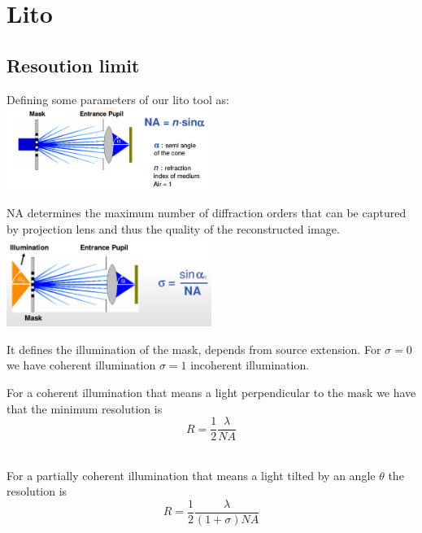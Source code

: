 
\section{Lito}

\subsection{Resoution limit}
Defining some parameters of our lito tool as:\\

\centering
\includegraphics[width=0.5\textwidth]{NA.png}\\
\raggedright

NA determines the maximum number of diffraction orders that can be captured by projection lens and thus the quality of the reconstructed image.\\

\centering
\includegraphics[width=0.5\textwidth]{sigma.png}\\
\raggedright

It defines the illumination of the mask, depends from source extension. For $\sigma=0$ we have coherent illumination $\sigma=1$ incoherent illumination.\\

\vspace{3mm}

For a coherent illumination that means a light perpendicular to the mask we have that the minimum resolution is 
\begin{equation}
R=\frac{1}{2}\frac{\lambda}{NA}
\end{equation}
\\
\vspace{3mm}

For a partially coherent illumination that means a light tilted by an angle $\theta$ the resolution is
\begin{equation}
R=\frac{1}{2}\frac{\lambda}{(1+\sigma)NA}
\end{equation}
\\

